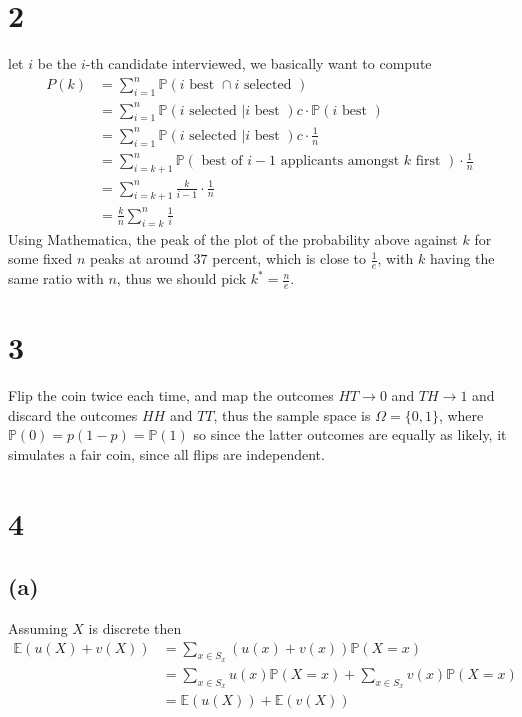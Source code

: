 \documentclass[a4paper,11pt]{article}
\begin{document}
\section{2}
let $i$ be the $i$-th candidate interviewed, we basically want to compute
\begin{align}
P(k) &= \sum_{i=1}^n \mathbb{P}( i \text { best } \cap i \text{ selected } ) \\
       &= \sum_{i=1}^n \mathbb{P}( i \text{ selected } | i \text{ best } )c \cdot \mathbb{P}(i \text{ best } )\\
       &=\sum_{i=1}^n \mathbb{P}( i \text{ selected } | i \text{ best } )c \cdot \frac{1}{n}\\
       &= \sum_{i=k+1}^n \mathbb{P}( \text{ best of $i-1$ applicants amongst $k$ first } ) \cdot \frac{1}{n} \\
       &= \sum_{i=k+1}^n  \frac{k}{i-1} \cdot \frac{1}{n}\\
       &= \frac{k}{n}\sum_{i=k}^n \frac{1}{i}
\end{align}
Using Mathematica, the peak of the plot of the probability above against $k$ for some fixed $n$ peaks at around $37$ percent, which is close to $\frac{1}{e}$, with $k$ having the same ratio with $n$, thus we should pick $k^* = \frac{n}{e}$. 
\clearpage
\section{3}

Flip the coin twice each time, and map the outcomes $HT \to 0$ and $TH \to 1$ and discard the outcomes $HH$ and $TT$, thus the sample space is $\Omega = \{0,1\}$, where $\mathbb{P}(0) = p(1-p) = \mathbb{P}(1)$ so since the latter outcomes are equally as likely, it simulates a fair coin, since all flips are independent.
\clearpage
\section{4}
\subsection{(a)}
Assuming $X$ is discrete then
\begin{align*}
\mathbb{E}(u(X) + v(X)) &= \sum_{x \in S_x} (u(x) + v(x)) \mathbb{P}(X = x)\\
			  &= \sum_{x \in S_x} u(x) \mathbb{P}(X = x) + \sum_{x \in S_x} v(x)\mathbb{P}(X =x)\\
			  &= \mathbb{E}(u(X)) + \mathbb{E}(v(X))
\end{align*}
\end{document}
